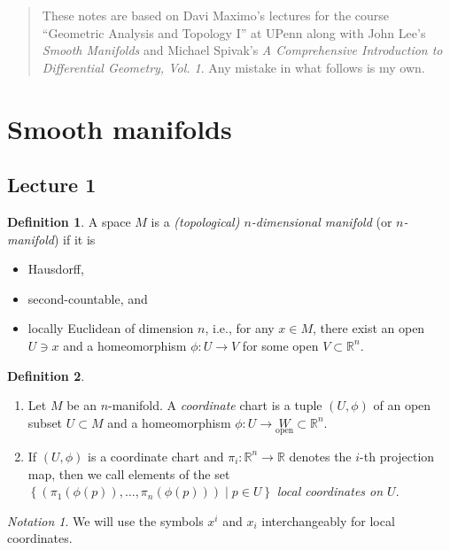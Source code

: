 \documentclass[10pt,letterpaper,cm]{nupset}
\theoremstyle{definition}
\newtheorem{definition}{Definition}[subsection]
\theoremstyle{theorem}
\theoremstyle{remark}
\newtheorem*{notation}{Notation}
\newcommand{\R}{\mathbb R}
\newcommand{\1}{\mathbf{1}}
\newcommand{\0}{\vec 0}
\begin{document}
\begin{abstract}
These notes are based on Davi Maximo's lectures for the course ``Geometric Analysis and Topology I'' at UPenn along with John Lee's \textit{Smooth Manifolds} and Michael Spivak's \textit{A Comprehensive Introduction to Differential Geometry, Vol. 1}. Any mistake in what follows is my own.
\end{abstract}


\tableofcontents
\newpage

\section{Smooth manifolds}

\subsection{Lecture 1}

\theoremstyle{definition}
\begin{definition}{A space $M$ is a \textit{(topological) $n$-dimensional manifold} (or \textit{$n$-manifold}) if it is 
\begin{itemize}
\item Hausdorff, 
\item second-countable, and 
\item locally Euclidean of dimension $n$, i.e., for any $x\in M$, there exist an open $U\ni x$ and a homeomorphism $\phi : U \to V$ for some open $V\subset \R^n$.
\end{itemize}
}
\end{definition}

\begin{definition} $ $
\begin{enumerate}
\item Let $M$ be an $n$-manifold. A \textit{coordinate} chart is a tuple $(U, \phi)$ of an open subset $U\subset M$ and a homeomorphism $\phi: U \to \underset{\text{open}} W \subset \R^n$.
\item If $(U, \phi)$ is a coordinate chart and $\pi_i : \R^n \to \R$ denotes the $i$-th projection map, then we call elements of the set $\left\{\left(\pi_1(\phi(p)), \ldots, \pi_n(\phi(p))\right) \mid p \in U\right\}$ \textit{local coordinates on $U$}.
\end{enumerate}
\end{definition}

\begin{notation}
We will use the symbols $x^i$ and $x_i$ interchangeably for local coordinates. 
\end{notation}
\end{document}
